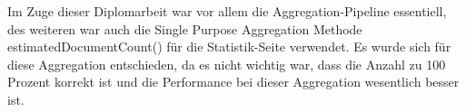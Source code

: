 Im Zuge dieser Diplomarbeit war vor allem die Aggregation-Pipeline essentiell, des weiteren war auch die Single Purpose Aggregation Methode estimatedDocumentCount() für die Statistik-Seite  verwendet. Es wurde sich für diese Aggregation entschieden, da es nicht wichtig war, dass die Anzahl zu 100 Prozent korrekt ist und die Performance bei dieser Aggregation wesentlich besser ist.
\cite{mongodb_aggregation_basics}